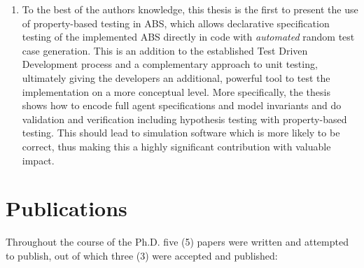 \begin{enumerate}
	\item To the best of the authors knowledge, this thesis is the first to present the use of property-based testing in ABS, which allows declarative specification testing of the implemented ABS directly in code with \textit{automated} random test case generation. This is an addition to the established Test Driven Development process and a complementary approach to unit testing, ultimately giving the developers an additional, powerful tool to test the implementation on a more conceptual level. More specifically, the thesis shows how to encode full agent specifications and model invariants and do validation and verification including hypothesis testing with property-based testing. This should lead to simulation software which is more likely to be correct, thus making this a highly significant contribution with valuable impact.

\end{enumerate}

\section{Publications}
Throughout the course of the Ph.D. five (5) papers were written and attempted to publish, out of which three (3) were accepted and published:

